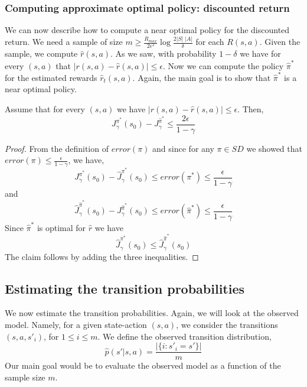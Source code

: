 \subsubsection{Computing approximate optimal policy: discounted return}

We can now describe how to compute a near optimal policy for the
discounted return.
We need a sample of size $m\geq \frac{R_{max}}{2\epsilon^2}\log
\frac{2|S|\;|A|}{\delta}$ for each $R(s,a)$. Given the sample, we
compute $\widehat{r}(s,a)$. As we saw, with probability $1-\delta$ we
have for every $(s,a)$ that $|r(s,a)-\widehat{r}(s,a)|\leq \epsilon$.
Now we can compute the policy $\widehat{\pi}^*$ for the estimated
rewards $\widehat{r}_t(s,a)$. Again, the main goal is to show that
$\widehat{\pi}^*$ is a near optimal policy.

\begin{claim}
Assume that for every $(s,a)$ we have $|r(s,a)-\widehat{r}(s,a)|\leq
\epsilon$. Then,
\[
J^{\pi^*}_\gamma(s_0) - J^{\widehat{\pi}^*}_\gamma \leq
\frac{2\epsilon}{1-\gamma}
\]
\end{claim}

\begin{proof}
From the definition of $error(\pi)$ and since for any $\pi\in SD$ we
showed that $error(\pi)\leq \frac{\epsilon}{1-\gamma}$, we have,
\[
J^{\pi^*}_\gamma(s_0)- \widehat{J}^{\pi^*}_\gamma(s_0)\leq
error(\pi^*)\leq \frac{\epsilon}{1-\gamma}
\]
and
\[
\widehat{J}^{\widehat{\pi}^*}_\gamma(s_0)- J^{\widehat{\pi}^*}_\gamma(s_0)\leq
error(\widehat{\pi}^*)\leq \frac{\epsilon}{1-\gamma}
\]
Since $\widehat{\pi}^*$ is optimal for $\widehat{r}$ we have
\[
\widehat{J}^{\pi^*}_\gamma(s_0)\leq \widehat{J}^{\widehat{\pi}^*}_\gamma(s_0)
\]
The claim follows by adding the three inequalities.
\end{proof}

\subsection{Estimating the transition probabilities}

We now estimate the transition probabilities. Again, we will
look at the observed model. Namely, for a given state-action
$(s,a)$, we consider the transitions $(s,a,s'_i)$, for $1\leq i\leq
m$. We define the observed transition distribution,
\[
\widehat{p}(s'|s,a)=\frac{|\{i:s'_i=s'\}|}{m}
\]
Our main goal would be to evaluate the observed model as a function
of the sample size $m$.

